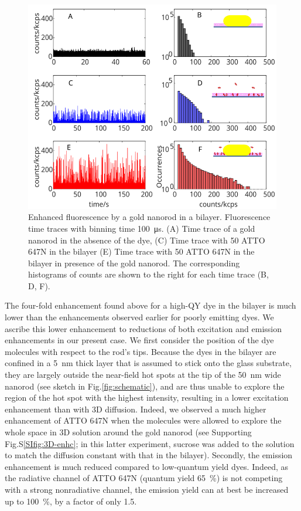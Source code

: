 \begin{figure}
	\centering
	\includegraphics[]{timetrace_hist}
	\caption{Enhanced fluorescence by a gold nanorod in a bilayer. Fluorescence time traces with binning time \SI{100}{\us}. 
	(A) Time trace of a gold nanorod in the absence of the dye, (C) Time trace with \SI{50}{\pM} ATTO 647N in the bilayer (E) Time trace with \SI{50}{\pM} ATTO 647N in the bilayer in presence of the gold nanorod. 
	The corresponding histograms of counts are shown to the right for each time trace (B, D, F).}
	\label{fig:timetrace_hist}
\end{figure}


The four-fold enhancement found above for a high-QY dye in the bilayer is much lower than the enhancements observed earlier for poorly emitting dyes.\cite{yuan2013thousandfold}
We ascribe this lower enhancement to reductions of both excitation and emission enhancements in our present case.
We first consider the position of the dye molecules with respect to the rod’s tips.
Because the dyes in the bilayer are confined in a \SI{5}{\nm} thick layer that is assumed to stick onto the glass substrate, they are largely outside the near-field hot spots at the tip of the \SI{50}{\nm} wide nanorod (see sketch in Fig.\ref{fig:schematic}), and are thus unable to explore the region of the hot spot with the highest intensity, resulting in a lower excitation enhancement than with 3D diffusion.
Indeed, we observed a much higher enhancement of ATTO 647N when the molecules were allowed to explore the whole space in 3D solution around the gold nanorod (see Supporting Fig.S\ref{SIfig:3D-enhc}; in this latter experiment, sucrose was added to the solution to match the diffusion constant with that in the bilayer).
Secondly, the emission enhancement is much reduced compared to low-quantum yield dyes.
Indeed, as the radiative channel of ATTO 647N (quantum yield \SI{65}{\percent}) is not competing with a strong nonradiative channel, the emission yield can at best be increased up to \SI{100}{\percent}, by a factor of only 1.5.\cite{khatua2014resonant}

